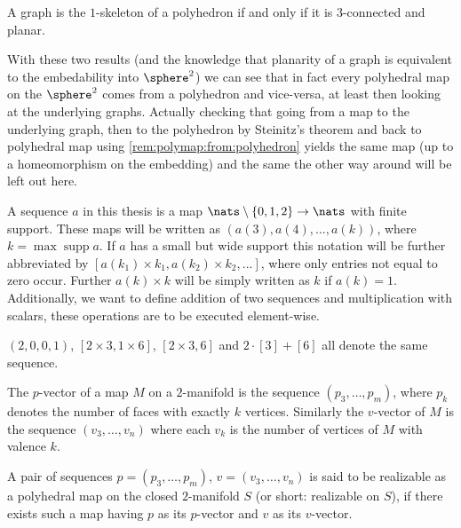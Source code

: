 \begin{theorem} A graph is the $1$-skeleton of a polyhedron if and only if it is $3$-connected and planar.
\end{theorem}

With these two results (and the knowledge that planarity of a graph is equivalent to the embedability into $\sphere^2$) we can see that in fact every polyhedral map on the $\sphere^2$ comes from a polyhedron and vice-versa, at least then looking at the underlying graphs. Actually checking that going from a map to the underlying graph, then to the polyhedron by {\sc Steinitz's} theorem and back to polyhedral map using \autoref{rem:polymap:from:polyhedron} yields the same map (up to a homeomorphism on the embedding) and the same the other way around will be left out here.

\begin{definition}[Sequence]
  A sequence $a$ in this thesis is a map $\nats \setminus \{0, 1, 2\} \rightarrow \nats$ with finite support. These maps will be written as $(a(3), a(4), ..., a(k))$, where $k = \operatorname{max} \operatorname{supp} a$. If $a$ has a small but wide support this notation will be further abbreviated by $[a(k_1) \times k_1, a(k_2) \times k_2, ...]$, where only entries not equal to zero occur. Further $a(k) \times k$ will be simply written as $k$ if $a(k) = 1$. Additionally, we want to define addition of two sequences and multiplication with scalars, these operations are to be executed element-wise.
\end{definition}
\begin{example}
  $(2, 0, 0, 1)$, $[2 \times 3, 1 \times 6]$, $[2 \times 3, 6]$ and $2 \cdot [3] + [6]$ all denote the same sequence.
\end{example}
\begin{definition}\label{def:relizable}
  The $p$-vector of a map $M$ on a $2$-manifold is the sequence $(p_3, \dots, p_m)$, where $p_k$ denotes the number of faces with exactly $k$ vertices. Similarly the $v$-vector of $M$ is the sequence $(v_3, \dots, v_n)$ where each $v_k$ is the number of vertices of $M$ with valence $k$.
\end{definition}

\begin{definition}\label{def:realizable}
  A pair of sequences $p = (p_3, \dots, p_m)$, $v = (v_3, \dots, v_n)$ is said to be realizable as a polyhedral map on the closed $2$-manifold $S$ (or short: realizable on $S$), if there exists such a map having $p$ as its $p$-vector and $v$ as its $v$-vector.
\end{definition}

